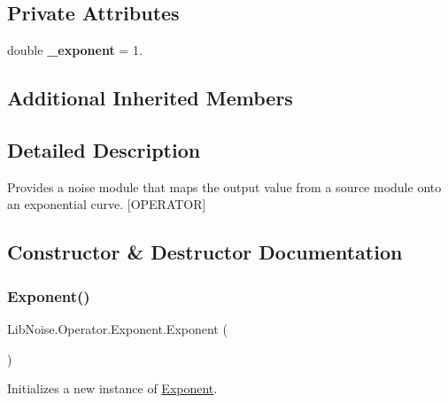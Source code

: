 \subsection*{Private Attributes}
\begin{DoxyCompactItemize}
\item 
\mbox{\label{class_lib_noise_1_1_operator_1_1_exponent_af4c139becd78f20183d807b3be66d0d2}} 
double {\bfseries \+\_\+exponent} = 1.
\end{DoxyCompactItemize}
\subsection*{Additional Inherited Members}


\subsection{Detailed Description}
Provides a noise module that maps the output value from a source module onto an exponential curve. \mbox{[}O\+P\+E\+R\+A\+T\+OR\mbox{]} 



\subsection{Constructor \& Destructor Documentation}
\mbox{\label{class_lib_noise_1_1_operator_1_1_exponent_ae7d1729cfe5163cf53d19e86c46a870e}} 
\subsubsection{\texorpdfstring{Exponent()}{Exponent()}\hspace{0.1cm}{\footnotesize\ttfamily [1/3]}}
{\footnotesize\ttfamily Lib\+Noise.\+Operator.\+Exponent.\+Exponent (\begin{DoxyParamCaption}{ }\end{DoxyParamCaption})}



Initializes a new instance of \hyperlink{class_lib_noise_1_1_operator_1_1_exponent}{Exponent}. 

\mbox{\label{class_lib_noise_1_1_operator_1_1_exponent_acb51ec00cd5faaba078f051db36c5f1a}} 
